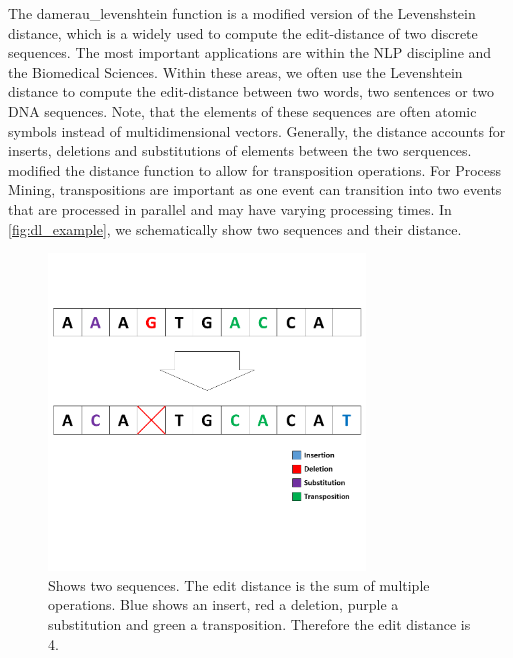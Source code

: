 \documentclass[./../../paper.tex]{subfiles}
\begin{document}
The \gls{damerau_levenshtein} function is a modified version of the Levenshstein distance\autocite{levenshtein_Binarycodescapable_1965}, which is a widely used to compute the edit-distance of two discrete sequences\autocites{apostolico_SequenceAlignmentMolecular_1998,Mitton20101}. The most important applications are within the \gls{NLP} discipline and the Biomedical Sciences. Within these areas, we often use the Levenshtein distance to compute the edit-distance between two words, two sentences or two DNA sequences. Note, that the elements of these sequences are often atomic symbols instead of multidimensional vectors. Generally, the distance accounts for inserts, deletions and substitutions of elements between the two serquences.
\citeauthor{damerau_techniquecomputerdetection_1964} modified the distance function to allow for transposition operations. For Process Mining, transpositions are important as one event can transition into two events that are processed in parallel and may have varying processing times.
In \autoref{fig:dl_example}, we schematically show two sequences and their distance.


\begin{figure}[htb]
    \centering
    \includegraphics[width=0.75\textwidth]{figures/Graphics/Slide6.PNG}
    \caption{Shows two sequences. The edit distance is the sum of multiple operations. Blue shows an insert, red a deletion, purple a substitution and green a transposition. Therefore the edit distance is 4.}
    \label{fig:dl_example}
\end{figure}
\end{document}
